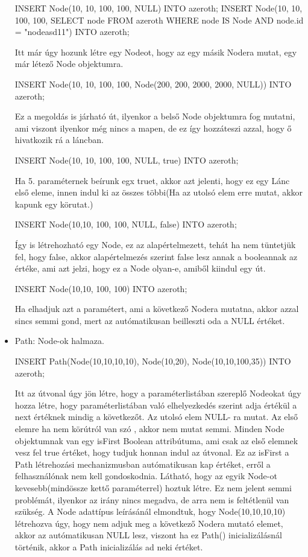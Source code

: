 \begin{itemize}
\begin{sql}
INSERT Node(10, 10, 100, 100, NULL) INTO azeroth;
INSERT Node(10, 10, 100, 100, SELECT node FROM azeroth WHERE node IS Node AND node.id = "nodeasd11") INTO azeroth;
\end{sql}
Itt már úgy hozunk létre egy Nodeot, hogy az egy másik Nodera mutat, egy már létező Node objektumra.
\begin{sql}
INSERT Node(10, 10, 100, 100, Node(200, 200, 2000, 2000, NULL)) INTO azeroth;
\end{sql}
Ez a megoldás is járható út, ilyenkor a belső Node objektumra fog mutatni, ami viszont ilyenkor még nincs a mapen, de ez így hozzáteszi azzal, hogy ő hivatkozik rá a láncban.
\begin{sql}
INSERT Node(10, 10, 100, 100, NULL, true) INTO azeroth;
\end{sql}
Ha 5. paraméternek beírunk egx truet, akkor azt jelenti, hogy ez egy Lánc első eleme, innen indul ki az összes többi(Ha az utolsó elem erre mutat, akkor kapunk egy körutat.)
\begin{sql}
INSERT Node(10,10, 100, 100, NULL, false) INTO azeroth;
\end{sql}
Így is létrehozható egy Node, ez az alapértelmezett, tehát ha nem tüntetjük fel, hogy false, akkor alapértelmezés szerint false lesz annak a booleannak az értéke, ami azt jelzi, hogy ez a Node olyan-e, amiből kiindul egy út.
\begin{sql}
INSERT Node(10,10, 100, 100) INTO azeroth;
\end{sql}
Ha elhadjuk azt a paramétert, ami a következő Nodera mutatna, akkor azzal sincs semmi gond, mert az autómatikusan beilleszti oda a NULL értéket.

\item Path: Node-ok halmaza.

\begin{sql}
INSERT Path(Node(10,10,10,10), Node(10,20), Node(10,10,100,35)) INTO azeroth;
\end{sql}

Itt az útvonal úgy jön létre, hogy a paraméterlistában szereplő Nodeokat úgy hozza létre, hogy paraméterlistában való elhelyezkedés szerint adja értékül a next értéknek mindig a következőt. Az utolsó elem NULL- ra mutat. Az első elemre ha nem körútról van szó , akkor nem mutat semmi. Minden Node objektumnak van egy isFirst Boolean attribútuma, ami csak az első elemnek vesz fel true értéket, hogy tudjuk honnan indul az útvonal. Ez az isFirst a Path létrehozási mechanizmusban autómatikusan kap értéket, erről a felhasználónak nem kell gondoskodnia.
Látható, hogy az egyik Node-ot kevesebb(mindössze kettő paraméterrel) hoztuk létre. Ez nem jelent semmi problémát, ilyenkor az irány nincs megadva, de arra nem is feltétlenül van szükség.
A Node adattípus leírásánál elmondtuk, hogy Node(10,10,10,10) létrehozva úgy, hogy nem adjuk meg a következő Nodera mutató elemet, akkor az autómatikusan NULL lesz, viszont ha ez Path() inicializálásnál történik, akkor a Path inicializálás ad neki értéket.


\end{itemize}
